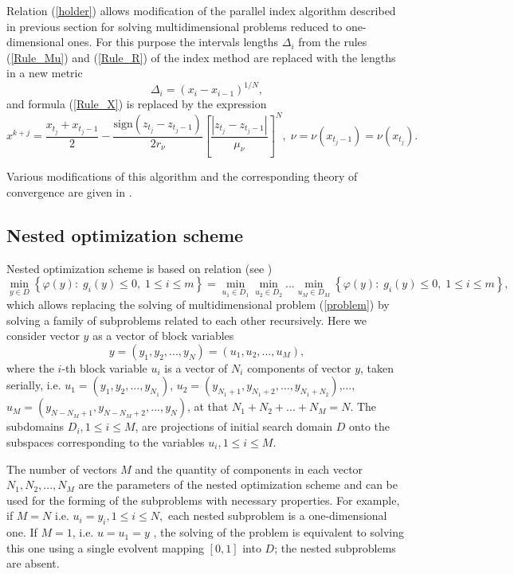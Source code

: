 \documentclass[a4paper]{jpconf}
\begin{document}
Relation (\ref{holder}) allows modification of the parallel index algorithm described in previous section for solving multidimensional problems reduced to one-dimensional ones. For this purpose the intervals lengths $\Delta_i$ from the rules (\ref{Rule_Mu}) and (\ref{Rule_R}) of the index method are replaced with the lengths in a new metric
\[
\Delta_i = \left(x_i-x_{i-1}\right)^{1/N},
\]
and formula (\ref{Rule_X}) is replaced by the expression
\[
x^{k+j} = \frac{x_{t_j}+x_{t_j-1}}{2} - \frac{\mathrm{sign}(z_{t_j}-z_{t_j-1})}{2r_\nu}\left[\frac{\left|z_{t_j}-z_{t_j-1}\right|}{\mu_\nu}\right]^N, \; \nu=\nu(x_{t_j-1})=\nu(x_{t_j}).
\]

Various modifications of this algorithm and the corresponding theory of convergence are given in \cite{Strongin2000,Strongin2013,Gergel2005}.


\subsection{Nested optimization scheme}

Nested optimization scheme is based on relation (see \cite{Strongin2013})
\[
\min_{y \in D}{\left\{\varphi(y): \; g_i(y)\leq 0, \; 1 \leq i \leq 
m\right\}}= \min_{u_1\in D_1}\min_{u_2\in D_2}...\min_{u_M\in D_M 
}{\left\{\varphi(y): \; g_i(y)\leq 0, \; 1 \leq i \leq m\right\}},
\]
which allows replacing the solving of multidimensional problem 
(\ref{problem}) by solving a family of subproblems related to each other 
recursively.
Here we consider vector $y$ as a vector of block variables
\[
y=(y_1,y_2,...,y_N)=(u_1,u_2,...,u_M),
\]
where the $i$-th block variable $u_i$ is a vector of $N_i$ components of 
vector $y$, taken serially, i.e. $u_1=(y_1,y_2,...,y_{N_1})$, 
$u_2=(y_{N_1+1},y_{N_1+2},...,y_{N_1+N_2})$,..., $u_M=(y_{N-N_M+1},y_{N-
N_M+2},...,y_{N})$, at that $N_1+N_2+...+N_M=N$. 
The subdomains $D_i, 1 \leq i \leq M$, are projections of initial search 
domain $D$ onto the subspaces corresponding to the variables $u_i, 1 \leq i 
\leq M$.

The number of vectors $M$ and the quantity of components in each vector $N_1, N_2,...,N_M$ are the parameters of the nested optimization scheme and can be used for the forming of the subproblems with necessary properties. For example, if  $M=N$ i.e. $u_i=y_i, 1\leq i \leq N,$ each nested subproblem is a one-dimensional one. If $M=1$, i.e. $u=u_1=y$ , the solving of the problem is equivalent to solving this one using a single evolvent mapping $[0,1]$ into $D$; the nested subproblems are absent. 
\end{document}
